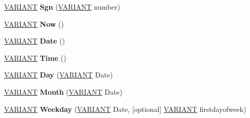 \begin{DoxyCompactItemize}
\item 
\mbox{\label{interface_v_b_script___global_1_1_global_obj_a611bb3388ec6baf3a52b9d07e7b2b057}} 
\hyperlink{structtag_v_a_r_i_a_n_t}{V\+A\+R\+I\+A\+NT} {\bfseries Sgn} (\hyperlink{structtag_v_a_r_i_a_n_t}{V\+A\+R\+I\+A\+NT} number)
\item 
\mbox{\label{interface_v_b_script___global_1_1_global_obj_a502eb801f38cfa8e4b15d4c3299a519f}} 
\hyperlink{structtag_v_a_r_i_a_n_t}{V\+A\+R\+I\+A\+NT} {\bfseries Now} ()
\item 
\mbox{\label{interface_v_b_script___global_1_1_global_obj_af6f755463026c8b9bda8d3d761a0d46e}} 
\hyperlink{structtag_v_a_r_i_a_n_t}{V\+A\+R\+I\+A\+NT} {\bfseries Date} ()
\item 
\mbox{\label{interface_v_b_script___global_1_1_global_obj_a4565564a5e60288cee998af2863d61bf}} 
\hyperlink{structtag_v_a_r_i_a_n_t}{V\+A\+R\+I\+A\+NT} {\bfseries Time} ()
\item 
\mbox{\label{interface_v_b_script___global_1_1_global_obj_a11850cd7bbbe069c12eb14f9e440d7ae}} 
\hyperlink{structtag_v_a_r_i_a_n_t}{V\+A\+R\+I\+A\+NT} {\bfseries Day} (\hyperlink{structtag_v_a_r_i_a_n_t}{V\+A\+R\+I\+A\+NT} Date)
\item 
\mbox{\label{interface_v_b_script___global_1_1_global_obj_a8224277fd30a14f3ebb16fd2d77965c0}} 
\hyperlink{structtag_v_a_r_i_a_n_t}{V\+A\+R\+I\+A\+NT} {\bfseries Month} (\hyperlink{structtag_v_a_r_i_a_n_t}{V\+A\+R\+I\+A\+NT} Date)
\item 
\mbox{\label{interface_v_b_script___global_1_1_global_obj_aad6d0502203110991e8a07803cd2064c}} 
\hyperlink{structtag_v_a_r_i_a_n_t}{V\+A\+R\+I\+A\+NT} {\bfseries Weekday} (\hyperlink{structtag_v_a_r_i_a_n_t}{V\+A\+R\+I\+A\+NT} Date, \mbox{[}optional\mbox{]} \hyperlink{structtag_v_a_r_i_a_n_t}{V\+A\+R\+I\+A\+NT} firstdayofweek)
\item 
\mbox{\label{interface_v_b_script___global_1_1_global_obj_a5ef8232e78786dd3e16cb88fd2687906}} 

\end{DoxyCompactItemize}
